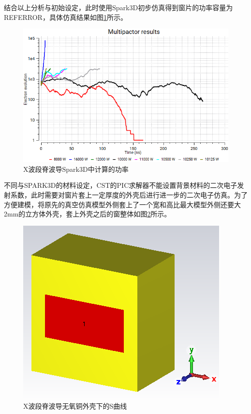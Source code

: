 \documentclass[master]{thesis-uestc}
\begin{document}
结合以上分析与初始设定，此时使用Spark3D初步仿真得到窗片的功率容量为REFERROR，具体仿真结果如图\ref{fig:X波段Spark3D中的功率}所示。
\begin{figure}[!htb]
    \centering
    \includegraphics[width=0.5\linewidth]{pic/chapter3/X波段Spark3D中的功率.png}
    \caption{X波段脊波导Spark3D中计算的功率}
    \label{fig:X波段Spark3D中的功率}
\end{figure}
不同与SPARK3D的材料设定，CST的PIC求解器不能设置背景材料的二次电子发射系数，此时需要对窗片套上一定厚度的外壳后进行进一步的二次电子仿真。为了方便建模，将原先的真空仿真模型外侧套上了一个宽和高比最大模型外侧还要大2mm的立方体外壳，套上外壳之后的窗整体如图\ref{fig:X无氧铜外壳}所示。
\begin{figure}[!htb]
    \centering
    \includegraphics[width=0.4\linewidth]{pic/chapter3/X脊波导窗无氧铜外壳.png}
    \caption{X波段脊波导无氧铜外壳下的S曲线}
    \label{fig:X无氧铜外壳}
\end{figure}
\end{document}
